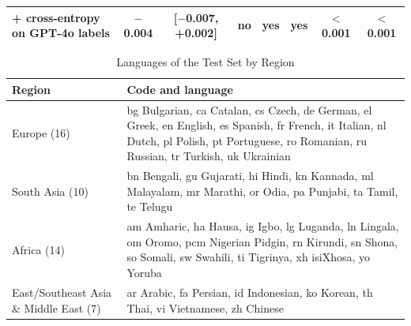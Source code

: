 \documentclass[journal,onecolumn]{IEEEtran}
\begin{document}
\begin{table}[!htbp]
\begin{tabular}{@{}lccccccc@{}}
\quad + cross-entropy on GPT-4o labels & $-$0.004 & [$-$0.007, +0.002] & no & yes & yes & $<$0.001 & $<$0.001 \\
\bottomrule
\end{tabular}
\par{}
\end{table}

\begin{table}[!htbp]
\caption{Languages of the Test Set by Region}
\label{tab:langs}
\centering
\footnotesize
\setlength{\tabcolsep}{4pt}
\begin{tabular}{@{}lp{}@{}}
\toprule
Region & Code and language \\
\midrule
Europe (16) & bg Bulgarian, ca Catalan, cs Czech, de German, el Greek, en English, es Spanish, fr French, it Italian, nl Dutch, pl Polish, pt Portuguese, ro Romanian, ru Russian, tr Turkish, uk Ukrainian \\
South Asia (10) & bn Bengali, gu Gujarati, hi Hindi, kn Kannada, ml Malayalam, mr Marathi, or Odia, pa Punjabi, ta Tamil, te Telugu \\
Africa (14) & am Amharic, ha Hausa, ig Igbo, lg Luganda, ln Lingala, om Oromo, pcm Nigerian Pidgin, rn Kirundi, sn Shona, so Somali, sw Swahili, ti Tigrinya, xh isiXhosa, yo Yoruba \\
East/Southeast Asia \& Middle East (7) & ar Arabic, fa Persian, id Indonesian, ko Korean, th Thai, vi Vietnamese, zh Chinese \\
\bottomrule
\end{tabular}
\par\vspace{2pt}{\footnotesize Codes follow ISO 639-1 except pcm, which follows ISO 639-3.\par}
\end{table}
\end{document}
